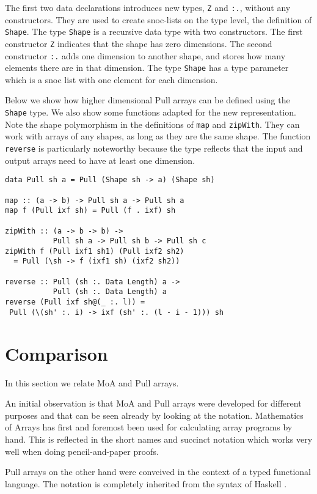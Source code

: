 \documentclass[preprint]{sigplanconf}
\begin{document}
The first two data declarations introduces new types, \verb!Z! and
\verb!:.!, without any constructors. They are used to create
snoc-lists on the type level, the definition of \verb!Shape!.  The
type \verb!Shape! is a recursive data type with two constructors. The
first constructor \verb!Z! indicates that the shape has zero
dimensions.  The second constructor \verb!:.! adds one dimension to
another shape, and stores how many elements there are in that
dimension. The type \verb!Shape! has a type parameter which is a snoc
list with one element for each dimension.

Below we show how higher dimensional Pull arrays can be defined using
the \verb!Shape! type. We also show some functions adapted for the new
representation. Note the shape polymorphism in the definitions of
\verb!map! and \verb!zipWith!. They can work with arrays of any
shapes, as long as they are the same shape.  The function
\verb!reverse! is particularly noteworthy because the type reflects
that the input and output arrays need to have at least one dimension.

\begin{verbatim}
data Pull sh a = Pull (Shape sh -> a) (Shape sh)

map :: (a -> b) -> Pull sh a -> Pull sh a
map f (Pull ixf sh) = Pull (f . ixf) sh

zipWith :: (a -> b -> b) -> 
           Pull sh a -> Pull sh b -> Pull sh c
zipWith f (Pull ixf1 sh1) (Pull ixf2 sh2)
  = Pull (\sh -> f (ixf1 sh) (ixf2 sh2))

reverse :: Pull (sh :. Data Length) a ->
           Pull (sh :. Data Length) a
reverse (Pull ixf sh@(_ :. l)) =
 Pull (\(sh' :. i) -> ixf (sh' :. (l - i - 1))) sh
\end{verbatim}


\section{Comparison}

In this section we relate MoA and Pull arrays. 

An initial observation is that MoA and Pull arrays were developed for
different purposes and that can be seen already by looking at the
notation. Mathematics of Arrays has first and foremost been used for
calculating array programs by hand. This is reflected in the short
names and succinct notation which works very well when doing
pencil-and-paper proofs.

Pull arrays on the other hand were conveived in the context of a
typed functional language. The notation is completely inherited from
the syntax of Haskell \cite{marlow2010haskell}.
\end{document}
